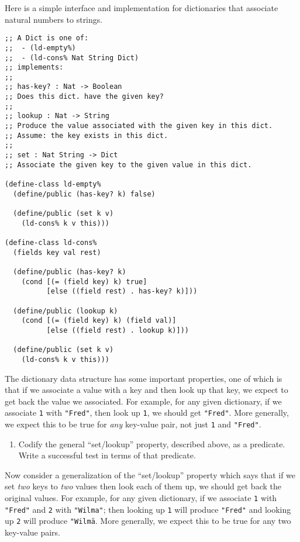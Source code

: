 \documentclass[12pt]{article}                   %
\def\pts#1{\marginpar{\footnotesize \raggedright  \fbox{#1 {\sc Points}}}}
\newcommand\code[1]{\texttt{#1}}
\begin{document}
\newpage
\ifrubric{}
\newpage
\fi

\begin{problem} \pts{??}
%
Here is a simple interface and implementation for dictionaries that
associate natural numbers to strings.

\begin{verbatim}
;; A Dict is one of:
;;  - (ld-empty%)
;;  - (ld-cons% Nat String Dict)
;; implements:
;;
;; has-key? : Nat -> Boolean
;; Does this dict. have the given key?
;;
;; lookup : Nat -> String
;; Produce the value associated with the given key in this dict.
;; Assume: the key exists in this dict.
;;
;; set : Nat String -> Dict
;; Associate the given key to the given value in this dict.

(define-class ld-empty%
  (define/public (has-key? k) false)

  (define/public (set k v)
    (ld-cons% k v this)))

(define-class ld-cons%
  (fields key val rest)

  (define/public (has-key? k)
    (cond [(= (field key) k) true]
          [else ((field rest) . has-key? k)]))

  (define/public (lookup k)
    (cond [(= (field key) k) (field val)]
          [else ((field rest) . lookup k)]))

  (define/public (set k v)
    (ld-cons% k v this)))
\end{verbatim}

The dictionary data structure has some important properties, one of
which is that if we associate a value with a key and then look up that
key, we expect to get back the value we associated.  For example, for
any given dictionary, if we associate \code{1} with \code{"Fred"},
then look up \code{1}, we should get \code{"Fred"}.  More generally,
we expect this to be true for \emph{any} key-value pair, not just
\code{1} and \code{"Fred"}.

\begin{enumerate}
\item Codify the general ``set/lookup'' property, described above, as
  a predicate.  Write a successful test in terms of that predicate.
\end{enumerate}

Now consider a generalization of the ``set/lookup'' property which
says that if we set \emph{two} keys to \emph{two} values then look
each of them up, we should get back the original values.  For example, for
any given dictionary, if we associate \code{1} with \code{"Fred"} and
\code{2} with \code{"Wilma"}; then looking up \code{1} will produce
\code{"Fred"} and looking up \code{2} will produce \code{"Wilma\"}.
More generally, we expect this to be true for any two key-value pairs.


\end{problem}
\end{document}
